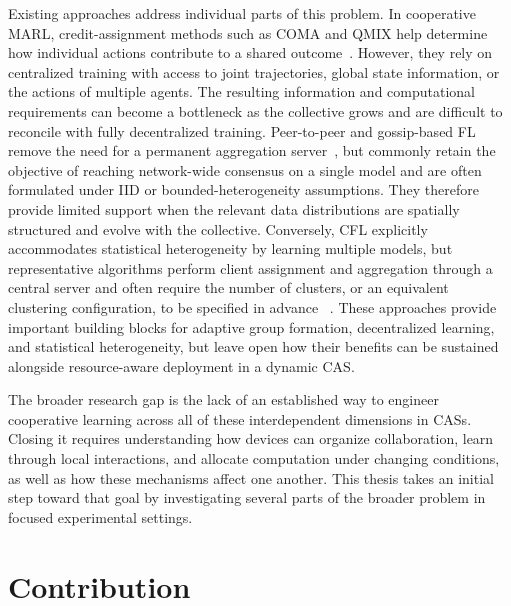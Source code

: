Existing approaches address individual parts of this problem.
%
In cooperative \gls{MARL},
 credit-assignment methods such as COMA and QMIX help determine how individual
 actions contribute to a shared outcome~\cite{foerster2018counterfactual,DBLP:conf/icml/RashidSWFFW18}.
%
However,
 they rely on centralized training with access to joint trajectories,
 global state information, or the actions of multiple agents.
%
The resulting information and computational requirements can become a bottleneck
 as the collective grows and are difficult to reconcile with fully decentralized training.
%
Peer-to-peer and gossip-based \gls{FL} remove the need for a permanent aggregation
 server~\cite{DBLP:conf/dais/HegedusDJ19}, but commonly retain the objective of
 reaching network-wide consensus on a single model and are often formulated under
 \gls{IID} or bounded-heterogeneity assumptions.
%
They therefore provide limited support when the relevant data distributions are
 spatially structured and evolve with the collective.
%
Conversely,
 \gls{CFL} explicitly accommodates statistical heterogeneity by learning multiple
 models, but representative algorithms perform client assignment and aggregation
 through a central server and often require the number of clusters, or an equivalent
 clustering configuration, to be specified in advance
 ~\cite{DBLP:journals/tit/GhoshCYR22,DBLP:journals/tnn/SattlerMS21}.
%
These approaches provide important building blocks for adaptive group formation,
 decentralized learning, and statistical heterogeneity, but leave open how
 their benefits can be sustained alongside resource-aware deployment in a
 dynamic \gls{CAS}.

The broader research gap is the lack of an established way to engineer
 cooperative learning across all of these interdependent dimensions in \glspl{CAS}.
%
Closing it requires understanding how devices can organize collaboration,
 learn through local interactions, and allocate computation under changing
 conditions, as well as how these mechanisms affect one another.
%
This thesis takes an initial step toward that goal by investigating
 several parts of the broader problem in focused experimental settings.

\section{Contribution}


